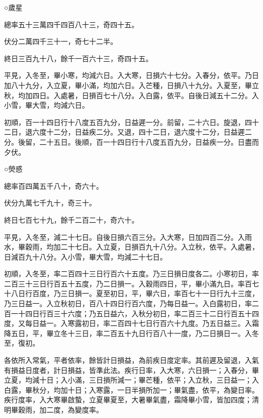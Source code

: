 \begin{pinyinscope}
 ○歲星



 總率五十三萬四千四百八十三，奇四十五。



 伏分二萬四千三十一，奇七十二半。



 終日三百九十八，餘千一百六十三，奇四十五。



 平見，入冬至，畢小寒，均減六日。入大寒，日損六十七分。入春分，依平。乃日加八十九分，入立夏，畢小滿，均加六日。入芒種，日損八十九分。入夏至，畢立秋，均加四日。入處暑，日損百七十八分。入白露，依平。自後日減五十二分。入小雪，畢大雪，均減六日。



 初順，百一十四日行十八度五百九分，日益遲一分。前留，二十六日。旋退，四十二日，退六度十二分，日益疾二分。又退，四十二日，退六度十二分，日益遲二分。後留，二十五日。後順，百一十四日行十八度五百九分，日益疾一分。日盡而夕伏。



 ○熒惑



 總率百四萬五千八十，奇六十。



 伏分九萬七千九十，奇三十。



 終日七百七十九，餘千二百二十，奇六十。



 平見，入冬至，減二十七日。自後日損六百三分。入大寒，日加四百二分。入雨水，畢穀雨，均加二十七日。入立夏，日損百九十八分。入立秋，依平。入處暑，日減百九十八分。入小雪，畢大雪，均減二十七日。



 初順，入冬至，率二百四十三日行百六十五度。乃三日損日度各二。小寒初日，率二百三十三日行百五十五度，乃二日損一。入穀雨四日，平，畢小滿九日。率百七十八日行百度，乃三日損一。夏至初日，平，畢六日，率百七十一日行九十三度，乃三日益一。入立秋初日，百八十四日行百六度，乃每日益一。入白露初日，率二百一十四日行百三十六度；乃五日益六，入秋分初日，率二百三十二日行百五十四度，又每日益一。入寒露初日，率二百四十七日行百六十九度。乃五日益三。入霜降五日，平，畢立冬十三日，率二百五十九日行百八十一度，乃二日損日一。入冬至，復初。



 各依所入常氣，平者依率，餘皆計日損益，為前疾日度定率。其前遲及留退，入氣有損益日度者，計日損益，皆準此法。疾行日率，入大寒，六日損一；入春分，畢立夏，均減十日；入小滿，三日損所減一；畢芒種，依平；入立秋，三日益一；入白露，畢秋分，均加十日；入寒露，一日半損所加一；畢氣盡，依平，為變日率。疾行度率，入大寒畢啟蟄，立夏畢夏至，大暑畢氣盡，霜降畢小雪，皆加四度；清明畢穀雨，加二度，為變度率。




\end{pinyinscope}
